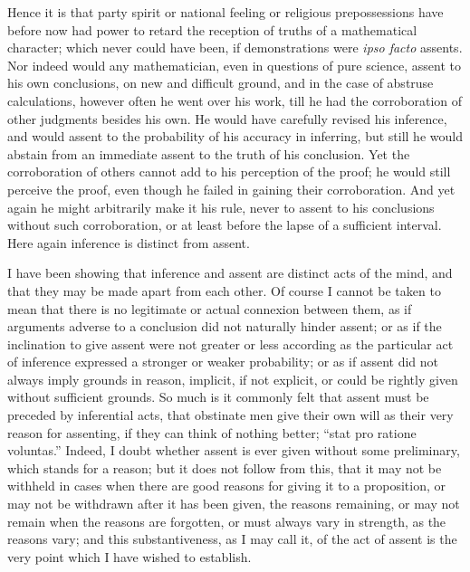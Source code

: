Hence it is that party spirit or national feeling or religious
prepossessions have before now had power to retard the reception of
truths of a mathematical character; which never could have been, if
demonstrations were \emph{ipso facto} assents. Nor indeed would
any mathematician, even in questions of pure science, assent to his
own conclusions, on new and difficult ground, and in the case of
abstruse calculations, however often he went over his work, till he
had the corroboration of other judgments besides his own. He would
have carefully revised his inference, and would assent to the
probability of his accuracy in inferring, but still he would abstain
from an immediate assent to the truth of his conclusion. Yet the
corroboration of others cannot add to his perception of the proof; he
would still perceive the proof, even though he failed in gaining their
corroboration. And yet again he might arbitrarily make it his rule,
never to assent to his conclusions without such corroboration, or at
least before the lapse of a sufficient interval. Here again inference
is distinct from assent.

I have been showing that inference and assent are distinct acts of
the mind, and that they may be made apart from each other. Of course I
cannot be taken to mean that there is no legitimate or actual
connexion between them, as if arguments adverse to a conclusion did
not naturally hinder assent; or as if the inclination to give assent
were not greater or less according as the particular act of inference
expressed a stronger or weaker probability; or as if assent did not
always imply grounds in reason, implicit, if not explicit, or could be
rightly given without sufficient grounds. So much is it commonly felt
that assent must be preceded by inferential acts, that obstinate men
give their own will as their very reason for assenting, if they can
think of nothing better; ``stat pro ratione voluntas.'' Indeed, I doubt whether assent is ever given without some preliminary,
which stands for a reason; but it does not follow from this, that it
may not be withheld in cases when there are good reasons for giving it
to a proposition, or may not be withdrawn after it has been given, the
reasons remaining, or may not remain when the reasons are forgotten,
or must always vary in strength, as the reasons vary; and this
substantiveness, as I may call it, of the act of assent is the very
point which I have wished to establish.


